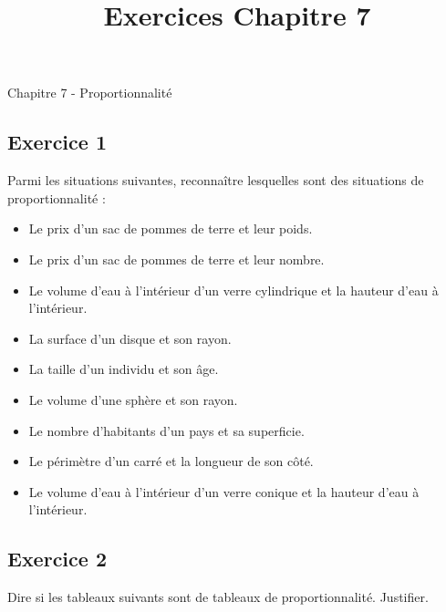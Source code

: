\documentclass[12 pt]{extarticle}
\title{Exercices Chapitre 7}
\date{}
\theoremstyle{plain}
\begin{document}
\begin{center}{\Large Chapitre 7 - Proportionnalité}\\
 \end{center} 

\subsection*{Exercice 1}

Parmi les situations suivantes, reconnaître lesquelles sont des situations de proportionnalité : \begin{itemize}
\item[a)] Le prix d'un sac de pommes de terre et leur poids.
\item[b)] Le prix d'un sac de pommes de terre et leur nombre.
\item[c)] Le volume d'eau à l'intérieur d'un verre cylindrique 
et la hauteur d'eau à l'intérieur. 
\item[d)] La surface d'un disque et son rayon.
\item[e)] La taille d'un individu et son âge.
\item[f)] Le volume d'une sphère et son rayon.
\item[g)] Le nombre d'habitants d'un pays et sa superficie. 
\item[h)] Le périmètre d'un carré et la longueur de son côté. 
\item[i)] Le volume d'eau à l'intérieur d'un verre conique
et la hauteur d'eau à l'intérieur. 
\end{itemize}


\subsection*{Exercice 2}
{Dire si les tableaux suivants sont de tableaux de proportionnalité. Justifier.}
\end{document}
